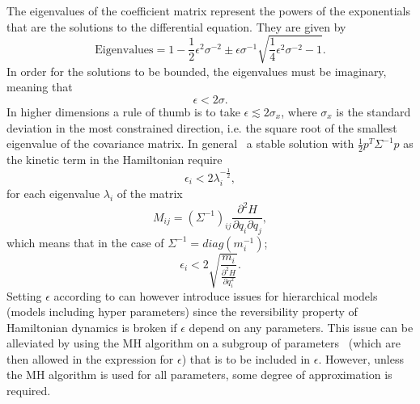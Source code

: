 The eigenvalues of the coefficient matrix represent the powers of the exponentials that are the solutions to the differential equation. They are given by
\begin{equation}
	\text{Eigenvalues}=1-\frac{1}{2}\epsilon^2\sigma^{-2}\pm \epsilon\sigma^{-1}\sqrt{\frac{1}{4}\epsilon^2\sigma^{-2}-1}.
\end{equation}
In order for the solutions to be bounded, the eigenvalues must be imaginary, meaning that
\begin{equation}
	\epsilon<2 \sigma.
	\label{gh}
\end{equation}
In higher dimensions a rule of thumb is to take $\epsilon\lesssim 2\sigma_x$, where $\sigma_x$ is the standard deviation in the most constrained direction, i.e. the square root of the smallest eigenvalue of the covariance matrix. In general~\citep{Betancourt2013} a stable solution with $\frac{1}{2}p^T\Sigma^{-1}p$ as the kinetic term in the Hamiltonian require 
\begin{equation}
	\epsilon_i<2 \lambda_i^{-\frac{1}{2}},
	\label{laa}
\end{equation}
for each eigenvalue $\lambda_i$ of the matrix
\begin{equation}
	M_{ij}=(\Sigma^{-1})_{ij}\frac{\partial^2 H}{\partial q_i\partial q_j},
\end{equation}
which means that in the case of $\Sigma^{-1}=diag(m_i^{-1})$;
\begin{equation}
	\epsilon_i<2\sqrt{\frac{m_i}{\frac{\partial^2H}{\partial q^2_i}}}.
	\label{heu}
\end{equation}
Setting $\epsilon$ according to  can however introduce issues for hierarchical models (models including hyper parameters) since the reversibility property of Hamiltonian dynamics is broken if $\epsilon$ depend on any parameters. This issue can be alleviated by using the MH algorithm on a subgroup of parameters~\citep{Neal:1996,Neal2012} (which are then allowed in the expression for $\epsilon$) that is to be included in $\epsilon$. However, unless the MH algorithm is used for all parameters, some degree of approximation is required. 
\vspace{5mm} %

